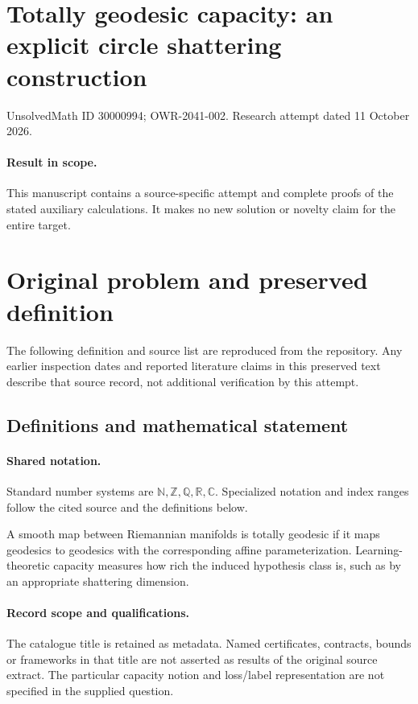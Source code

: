 \documentclass[11pt]{article}
\begin{document}
\section*{Totally geodesic capacity: an explicit circle shattering construction}
\noindent UnsolvedMath ID 30000994; OWR-2041-002. Research attempt dated 11 October 2026.
\paragraph{Result in scope.}This manuscript contains a source-specific attempt and complete proofs of the stated auxiliary calculations. It makes no new solution or novelty claim for the entire target.
\section{Original problem and preserved definition}
The following definition and source list are reproduced from the repository. Any earlier inspection dates and reported literature claims in this preserved text describe that source record, not additional verification by this attempt.
\subsection{Definitions and mathematical statement}

\paragraph{Shared notation.}Standard number systems are $\mathbb N,\mathbb Z,\mathbb Q,\mathbb R,\mathbb C$. Specialized notation and index ranges follow the cited source and the definitions below.


A smooth map between Riemannian manifolds is totally geodesic if it maps geodesics to geodesics with the corresponding affine parameterization. Learning-theoretic capacity measures how rich the induced hypothesis class is, such as by an appropriate shattering dimension.
\paragraph{Record scope and qualifications.}
The catalogue title is retained as metadata. Named certificates, contracts, bounds or frameworks in that title are not asserted as results of the original source extract.
The particular capacity notion and loss/label representation are not specified in the supplied question.
\end{document}
